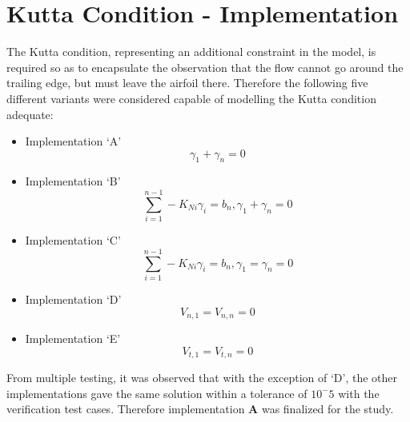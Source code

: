 \section{Kutta Condition - Implementation}
The Kutta condition, representing an additional constraint in the model, is required so as to encapsulate the observation that the flow cannot go around the trailing edge, but must leave the airfoil there. Therefore the following five different variants were considered capable of modelling the Kutta condition adequate:
\begin{itemize}
    \item Implementation `A'
    \begin{equation}
        \gamma_1 + \gamma_n = 0
    \end{equation}
    \item Implementation `B'
    \begin{equation}
        \sum_{i=1}^{n-1} - K_{Ni} \gamma_i = b_n, \gamma_1 + \gamma_n = 0
    \end{equation}
    \item Implementation `C'
    \begin{equation}
        \sum_{i=1}^{n-1} - K_{Ni} \gamma_i = b_n, \gamma_1 = \gamma_n = 0
    \end{equation}
    \item Implementation `D'
    \begin{equation}
        V_{n, 1} = V_{n, n} = 0
    \end{equation}
    \item Implementation `E'
    \begin{equation}
        V_{t, 1} = V_{t, n} = 0
    \end{equation}
\end{itemize}
From multiple testing, it was observed that with the exception of `D', the other implementations gave the same solution within a tolerance of $10^-5$ with the verification test cases. Therefore implementation \textbf{A} was finalized for the study.

